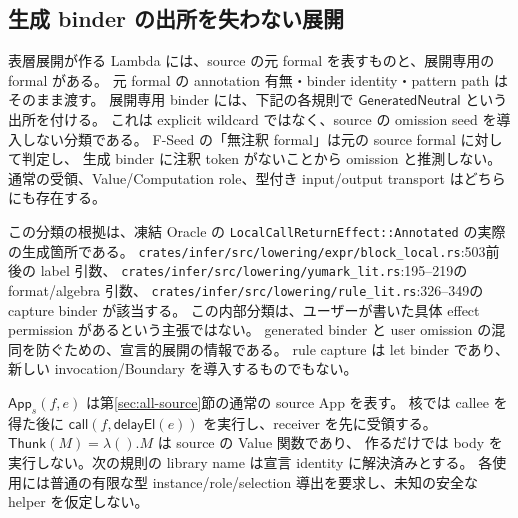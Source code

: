 \documentclass[11pt,a4paper]{article}
\newcommand{\Call}{\mathsf{call}}
\newcommand{\Delay}{\mathsf{delay}}
\newcommand{\El}{\mathsf{El}}
\begin{document}
\subsection{生成 binder の出所を失わない展開}

表層展開が作る Lambda には、source の元 formal を表すものと、展開専用の formal がある。
元 formal の annotation 有無・binder identity・pattern path はそのまま渡す。
展開専用 binder には、下記の各規則で \(\mathsf{GeneratedNeutral}\) という出所を付ける。
これは explicit wildcard ではなく、source の omission seed を導入しない分類である。
F-Seed の「無注釈 formal」は元の source formal に対して判定し、
生成 binder に注釈 token がないことから omission と推測しない。
通常の受領、Value/Computation role、型付き input/output transport はどちらにも存在する。

この分類の根拠は、凍結 Oracle の \texttt{LocalCallReturnEffect::Annotated} の実際の生成箇所である。
\nolinkurl{crates/infer/src/lowering/expr/block_local.rs}:503前後の label 引数、
\nolinkurl{crates/infer/src/lowering/yumark_lit.rs}:195--219の format/algebra 引数、
\nolinkurl{crates/infer/src/lowering/rule_lit.rs}:326--349の capture binder が該当する。
この内部分類は、ユーザーが書いた具体 effect permission があるという主張ではない。
generated binder と user omission の混同を防ぐための、宣言的展開の情報である。
rule capture は let binder であり、新しい invocation/Boundary を導入するものでもない。

\(\mathsf{App}_s(f,e)\) は第\ref{sec:all-source}節の通常の source App を表す。
核では callee を得た後に \(\Call(f,\Delay\El(e))\) を実行し、receiver を先に受領する。
\(\mathsf{Thunk}(M)=\lambda().M\) は source の Value 関数であり、
作るだけでは body を実行しない。次の規則の library name は宣言 identity に解決済みとする。
各使用には普通の有限な型 instance/role/selection 導出を要求し、未知の安全な helper を仮定しない。
\end{document}
